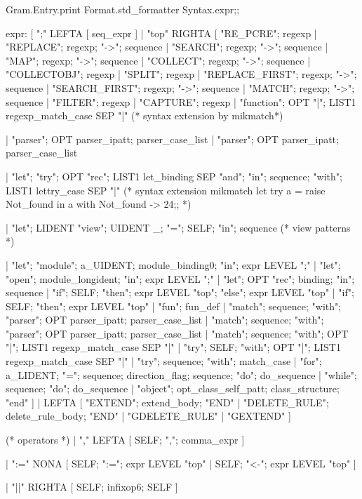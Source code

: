 \begin{enumerate}
\begin{enumerate}[(a)]
\begin{itemize}
\begin{redcode}  
Gram.Entry.print Format.std_formatter Syntax.expr;;
\end{redcode}

\begin{bluetext}
expr:
[ ";" LEFTA
  [ seq_expr ]
| "top" RIGHTA
  [ "RE_PCRE"; regexp
  | "REPLACE"; regexp; "->"; sequence
  | "SEARCH"; regexp; "->"; sequence
  | "MAP"; regexp; "->"; sequence
  | "COLLECT"; regexp; "->"; sequence
  | "COLLECTOBJ"; regexp
  | "SPLIT"; regexp
  | "REPLACE_FIRST"; regexp; "->"; sequence
  | "SEARCH_FIRST"; regexp; "->"; sequence
  | "MATCH"; regexp; "->"; sequence
  | "FILTER"; regexp
  | "CAPTURE"; regexp  
  | "function"; OPT "|"; LIST1 regexp_match_case SEP "|"
  (* syntax extension by mikmatch*)    

  | "parser"; OPT parser_ipatt; parser_case_list
  | "parser"; OPT parser_ipatt; parser_case_list

  | "let"; "try"; OPT "rec"; LIST1 let_binding SEP "and"; "in"; sequence;
    "with"; LIST1 lettry_case SEP "|"
 (*  syntax extension mikmatch
     let try a = raise Not_found in a with Not_found -> 24;; *)
 
  | "let"; LIDENT "view"; UIDENT _; "="; SELF; "in"; sequence
(*   view patterns *)
  
  | "let"; "module"; a_UIDENT; module_binding0; "in"; expr LEVEL ";"
  | "let"; "open"; module_longident; "in"; expr LEVEL ";"
  | "let"; OPT "rec"; binding; "in"; sequence
  | "if"; SELF; "then"; expr LEVEL "top"; "else"; expr LEVEL "top"
  | "if"; SELF; "then"; expr LEVEL "top"
  | "fun"; fun_def
  | "match"; sequence; "with"; "parser"; OPT parser_ipatt; parser_case_list
  | "match"; sequence; "with"; "parser"; OPT parser_ipatt; parser_case_list
  | "match"; sequence; "with"; OPT "|"; LIST1 regexp_match_case SEP "|"
  | "try"; SELF; "with"; OPT "|"; LIST1 regexp_match_case SEP "|"
  | "try"; sequence; "with"; match_case
  | "for"; a_LIDENT; "="; sequence; direction_flag; sequence; "do";
    do_sequence
  | "while"; sequence; "do"; do_sequence
  | "object"; opt_class_self_patt; class_structure; "end" ]
| LEFTA
  [ "EXTEND"; extend_body; "END"
  | "DELETE_RULE"; delete_rule_body; "END"
  | "GDELETE_RULE"
  | "GEXTEND" ]


(* operators *)  
| "," LEFTA
  [ SELF; ","; comma_expr ]

| ":=" NONA
  [ SELF; ":="; expr LEVEL "top"
  | SELF; "<-"; expr LEVEL "top" ]
  
| "||" RIGHTA
   [ SELF; infixop6; SELF ]


\end{bluetext}
\end{itemize}
\end{enumerate}
\end{enumerate}
